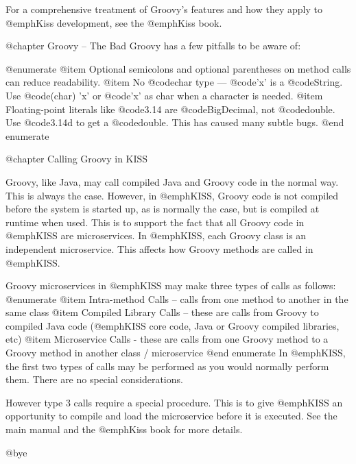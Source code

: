 For a comprehensive treatment of Groovy's features and how they apply
to @emph{Kiss} development, see the @emph{Kiss} book.

@chapter Groovy -- The Bad
Groovy has a few pitfalls to be aware of:

@enumerate
@item
Optional semicolons and optional parentheses on method calls can
reduce readability.
@item
No @code{char} type --- @code{'x'} is a @code{String}.
Use @code{(char) 'x'} or @code{'x' as char} when a character is needed.
@item
Floating-point literals like @code{3.14} are @code{BigDecimal}, not
@code{double}.  Use @code{3.14d} to get a @code{double}.  This has
caused many subtle bugs.
@end enumerate

@chapter Calling Groovy in KISS

Groovy, like Java, may call compiled Java and Groovy code in the
normal way.  This is always the case.  However, in @emph{KISS}, Groovy
code is not compiled before the system is started up, as is normally
the case, but is compiled at runtime when used.  This is to support
the fact that all Groovy code in @emph{KISS} are microservices.
In @emph{KISS}, each Groovy class is an independent microservice.
This affects how Groovy methods are called in @emph{KISS}.

Groovy microservices in @emph{KISS} may make three types of calls as follows:
@enumerate
@item
Intra-method Calls -- calls from one method to another in the same class
@item
Compiled Library Calls -- these are calls from Groovy to compiled Java
code (@emph{KISS} core code, Java or Groovy compiled libraries, etc)
@item 
Microservice Calls - these are calls from one Groovy method to a Groovy
method in another class / microservice
@end enumerate
In @emph{KISS}, the first two types of calls may be performed as you would normally
perform them.  There are no special considerations.

However type 3 calls require a special procedure.  This is to give @emph{KISS}
an opportunity to compile and load the microservice before it is executed.
See the main manual and the @emph{Kiss} book for more details.

@bye

